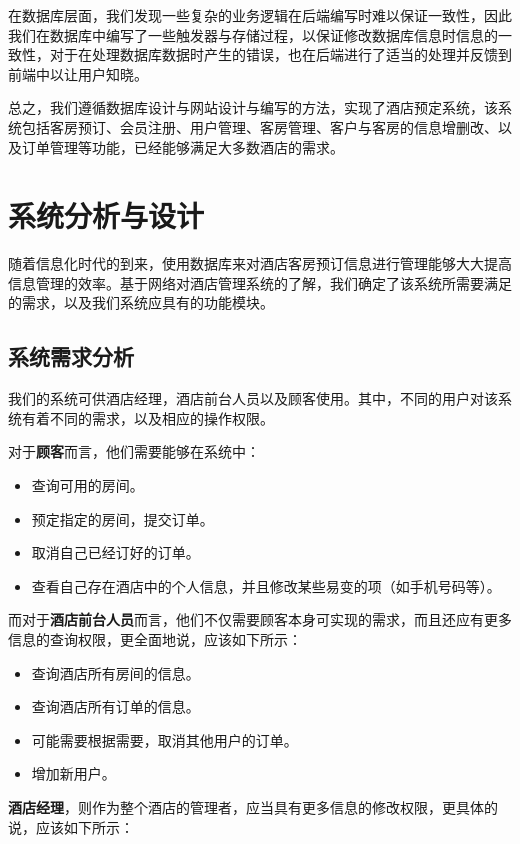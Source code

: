 \documentclass{myreport}
\begin{document}
在数据库层面，我们发现一些复杂的业务逻辑在后端编写时难以保证一致性，因此我们在数据库中编写了一些触发器与存储过程，以保证修改数据库信息时信息的一致性，对于在处理数据库数据时产生的错误，也在后端进行了适当的处理并反馈到前端中以让用户知晓。

总之，我们遵循数据库设计与网站设计与编写的方法，实现了酒店预定系统，该系统包括客房预订、会员注册、用户管理、客房管理、客户与客房的信息增删改、以及订单管理等功能，已经能够满足大多数酒店的需求。

\chapter{系统分析与设计}

随着信息化时代的到来，使用数据库来对酒店客房预订信息进行管理能够大大提高信息管理的效率。基于网络对酒店管理系统的了解，我们确定了该系统所需要满足的需求，以及我们系统应具有的功能模块。

\section{系统需求分析}

我们的系统可供酒店经理，酒店前台人员以及顾客使用。其中，不同的用户对该系统有着不同的需求，以及相应的操作权限。

对于\textbf{顾客}而言，他们需要能够在系统中：

\begin{itemize}
    \item 查询可用的房间。
    \item 预定指定的房间，提交订单。
    \item 取消自己已经订好的订单。
    \item 查看自己存在酒店中的个人信息，并且修改某些易变的项（如手机号码等）。
\end{itemize}

而对于\textbf{酒店前台人员}而言，他们不仅需要顾客本身可实现的需求，而且还应有更多信息的查询权限，更全面地说，应该如下所示：


\begin{itemize}
    \item 查询酒店所有房间的信息。
    \item 查询酒店所有订单的信息。
    \item 可能需要根据需要，取消其他用户的订单。 
    \item 增加新用户。
\end{itemize}

\textbf{酒店经理}，则作为整个酒店的管理者，应当具有更多信息的修改权限，更具体的说，应该如下所示：
\end{document}
